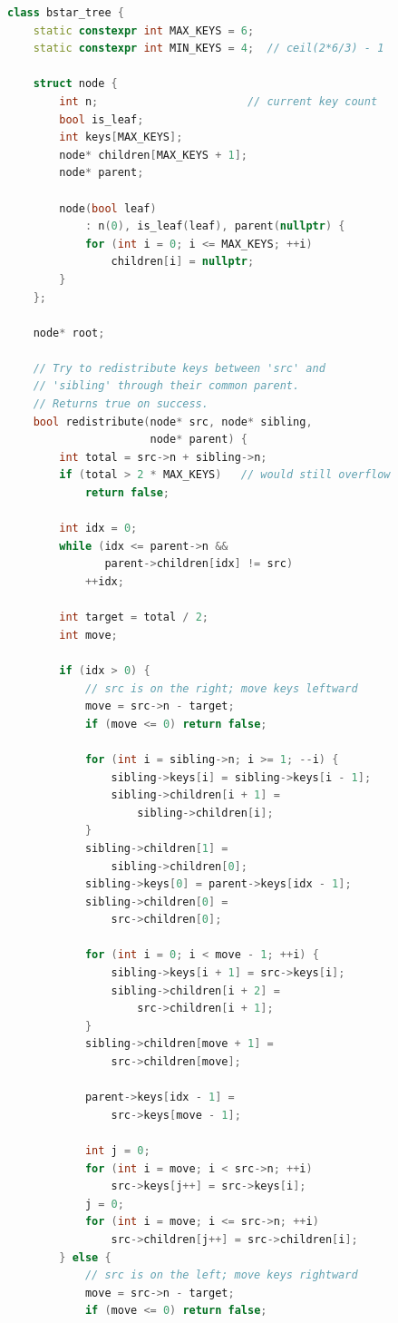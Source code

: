 \begin{lstlisting}[language=C++]
class bstar_tree {
    static constexpr int MAX_KEYS = 6;
    static constexpr int MIN_KEYS = 4;  // ceil(2*6/3) - 1

    struct node {
        int n;                       // current key count
        bool is_leaf;
        int keys[MAX_KEYS];
        node* children[MAX_KEYS + 1];
        node* parent;

        node(bool leaf)
            : n(0), is_leaf(leaf), parent(nullptr) {
            for (int i = 0; i <= MAX_KEYS; ++i)
                children[i] = nullptr;
        }
    };

    node* root;

    // Try to redistribute keys between 'src' and
    // 'sibling' through their common parent.
    // Returns true on success.
    bool redistribute(node* src, node* sibling,
                      node* parent) {
        int total = src->n + sibling->n;
        if (total > 2 * MAX_KEYS)   // would still overflow
            return false;

        int idx = 0;
        while (idx <= parent->n &&
               parent->children[idx] != src)
            ++idx;

        int target = total / 2;
        int move;

        if (idx > 0) {
            // src is on the right; move keys leftward
            move = src->n - target;
            if (move <= 0) return false;

            for (int i = sibling->n; i >= 1; --i) {
                sibling->keys[i] = sibling->keys[i - 1];
                sibling->children[i + 1] =
                    sibling->children[i];
            }
            sibling->children[1] =
                sibling->children[0];
            sibling->keys[0] = parent->keys[idx - 1];
            sibling->children[0] =
                src->children[0];

            for (int i = 0; i < move - 1; ++i) {
                sibling->keys[i + 1] = src->keys[i];
                sibling->children[i + 2] =
                    src->children[i + 1];
            }
            sibling->children[move + 1] =
                src->children[move];

            parent->keys[idx - 1] =
                src->keys[move - 1];

            int j = 0;
            for (int i = move; i < src->n; ++i)
                src->keys[j++] = src->keys[i];
            j = 0;
            for (int i = move; i <= src->n; ++i)
                src->children[j++] = src->children[i];
        } else {
            // src is on the left; move keys rightward
            move = src->n - target;
            if (move <= 0) return false;


\end{lstlisting}
